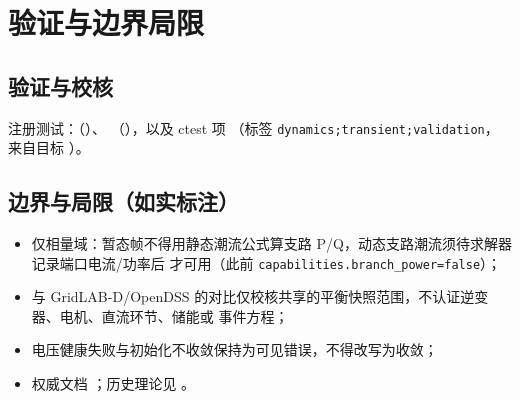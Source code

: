 \documentclass[UTF8,fontset=fandol,a4paper,11pt]{ctexart}
\begin{document}
\section{验证与边界局限}
\subsection{验证与校核}
注册测试：（）、
（），以及
ctest 项 （标签
\texttt{dynamics;transient;validation}，来自目标 ）。

\subsection{边界与局限（如实标注）}
\begin{itemize}
  \item 仅相量域：暂态帧不得用静态潮流公式算支路 P/Q，动态支路潮流须待求解器记录端口电流/功率后
        才可用（此前 \texttt{capabilities.branch\_power=false}）；
  \item 与 GridLAB-D/OpenDSS 的对比仅校核共享的平衡快照范围，不认证逆变器、电机、直流环节、储能或
        事件方程；
  \item 电压健康失败与初始化不收敛保持为可见错误，不得改写为收敛；
  \item 权威文档 ；历史理论见
        。
\end{itemize}

\end{document}
